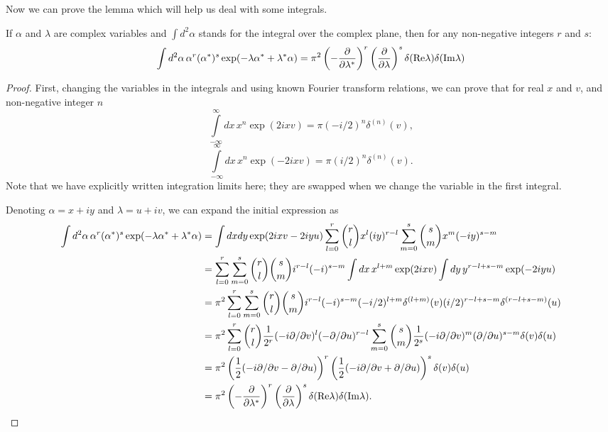 Now we can prove the lemma which will help us deal with some integrals.
\begin{lemma}
\label{lmm:formalism:c-numbers:fourier-of-moments}
If $\alpha$ and $\lambda$ are complex variables and $\int d^2\alpha$ stands for the integral over the complex plane, then for any non-negative integers $r$ and $s$:
\[
	\int d^2\alpha\, \alpha^r (\alpha^*)^s \exp(-\lambda \alpha^* + \lambda^* \alpha)
	= \pi^2
		\left( -\frac{\partial}{\partial \lambda^*} \right)^r
		\left( \frac{\partial}{\partial \lambda} \right)^s
		\delta(\mathrm{Re} \lambda) \delta(\mathrm{Im} \lambda)
\]
\end{lemma}
\begin{proof}
First, changing the variables in the integrals and using known Fourier transform relations, we can prove that for real $x$ and $v$, and non-negative integer $n$
\[
	\int\limits_{-\infty}^{\infty} dx\, x^n \exp(2 i x v) = \pi (-i / 2)^n \delta^{(n)}(v),
\]
\[
	\int\limits_{-\infty}^{\infty} dx\, x^n \exp(-2 i x v) = \pi (i / 2)^n \delta^{(n)}(v).
\]
Note that we have explicitly written integration limits here;
they are swapped when we change the variable in the first integral.

Denoting $\alpha = x + iy$ and $\lambda = u + iv$, we can expand the initial expression as
\begin{equation*}
\begin{split}
	\int d^2\alpha\, \alpha^r (\alpha^*)^s \exp(-\lambda \alpha^* + \lambda^* \alpha)
	& = \int dx dy \exp(2ixv - 2iyu)
		\sum\limits_{l=0}^r \binom{r}{l} x^l (iy)^{r-l}
		\sum\limits_{m=0}^s \binom{s}{m} x^m (-iy)^{s-m} \\
	& = \sum\limits_{l=0}^r \sum\limits_{m=0}^s \binom{r}{l} \binom{s}{m}
		i^{r-l} (-i)^{s-m}
		\int dx\, x^{l+m} \exp(2ixv)
		\int dy\, y^{r-l+s-m} \exp(-2iyu) \\
	& = \pi^2 \sum\limits_{l=0}^r \sum\limits_{m=0}^s \binom{r}{l} \binom{s}{m}
		i^{r-l} (-i)^{s-m}
		(-i/2)^{l+m} \delta^{(l+m)}(v)
		(i/2)^{r-l+s-m} \delta^{(r-l+s-m)}(u) \\
	& = \pi^2
		\sum\limits_{l=0}^r \binom{r}{l}
			\frac{1}{2^r}
			(-i \partial / \partial v)^l
			(-\partial / \partial u)^{r-l}
		\sum\limits_{m=0}^s \binom{s}{m}
			\frac{1}{2^s}
			(-i \partial / \partial v)^m
			(\partial / \partial u)^{s-m}
		\delta(v) \delta(u) \\
	& = \pi^2
		\left( \frac{1}{2} (-i \partial / \partial v - \partial / \partial u) \right)^r
		\left( \frac{1}{2} (-i \partial / \partial v + \partial / \partial u) \right)^s
		\delta(v) \delta(u) \\
	& = \pi^2
		\left( -\frac{\partial}{\partial \lambda^*} \right)^r
		\left( \frac{\partial}{\partial \lambda} \right)^s
		\delta(\mathrm{Re} \lambda) \delta(\mathrm{Im} \lambda).
		\qedhere
\end{split}
\end{equation*}
\end{proof}


